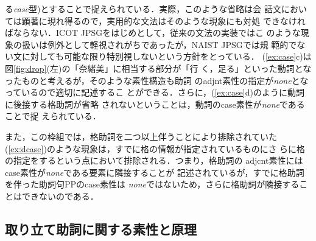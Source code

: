 る{\it case\/}型)とすることで捉えられている．実際，このような省略は会
話文においては顕著に現れ得るので，実用的な文法はそのような現象にも対処
できなければならない．ICOT JPSGをはじめとして，従来の文法の実装ではこ
のような現象の扱いは例外として軽視されがちであったが，NAIST JPSGでは規
範的でない文に対しても可能な限り特別視しないという方針をとっている．
(\ref{ex:case}c)は図\ref{fig:drop}(左)の「奈緒美」に相当する部分が「行
く，足る」といった動詞となったものと考えるが，そのような素性構造も助詞
の{\sc adjnt}素性の指定が{\it none\/}となっているので適切に記述するこ
とができる．さらに，(\ref{ex:case}d)のように動詞に後接する格助詞が省略
されないということは，動詞の{\sc case}素性が{\it none\/}であることで捉
えられている．

また，この枠組では，格助詞を二つ以上伴うことにより排除されていた
(\ref{ex:dcase})のような現象は，すでに格の情報が指定されているものにさ
らに格の指定をするという点において排除される．つまり，格助詞の{\sc
adjcnt}素性には{\sc case}素性が{\it none\/}である要素に隣接することが
記述されているが，すでに格助詞を伴った助詞句PPの{\sc case}素性は{\it
none\/}ではないため，さらに格助詞が隣接することはできないのである．


\subsection{取り立て助詞に関する素性と原理}\label{sec:jl:focus}

